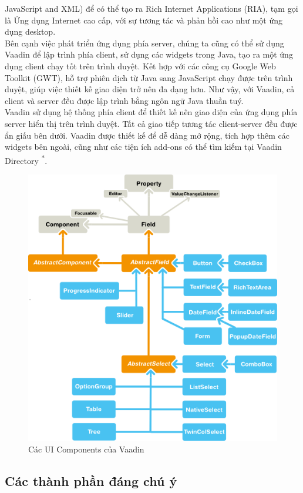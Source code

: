 JavaScript and XML) để có thể tạo ra Rich Internet Applications (RIA), tạm gọi là Ứng dụng Internet cao cấp, với sự tương tác và phản hồi cao như một ứng dụng desktop.
\\
Bên cạnh việc phát triển ứng dụng phía server, chúng ta cũng có thể sử dụng Vaadin để lập trình phía client, sử dụng các widgets trong Java, tạo ra một ứng dụng client chạy tốt trên trình duyệt. Kết hợp với các công cụ Google Web Toolkit (GWT), hỗ trợ phiên dịch từ Java sang JavaScript chạy được trên trình duyệt, giúp việc thiết kế giao diện trở nên đa dạng hơn. Như vậy, với Vaadin, cả client và server đều được lập trình bằng ngôn ngữ Java thuần tuý.
{\let\thefootnote\relax{}
}
\\
Vaadin sử dụng hệ thống phía client để thiết kế nên giao diện của ứng dụng phía server hiển thị trên trình duyệt. Tất cả giao tiếp tương tác client-server đều được ẩn giấu bên dưới. Vaadin được thiết kế để dễ dàng mở rộng, tích hợp thêm các widgets bên ngoài, cũng như các tiện ích add-ons có thể tìm kiếm tại Vaadin Directory \textsuperscript{*}.
\begin{figure}[h!]
	\centering
	\includegraphics[width=120mm]{Figures/vaadin_architecture1.png}
	\caption{Các UI Components của Vaadin\label{overflow}}
\end{figure}
\subsection{Các thành phần đáng chú ý}

